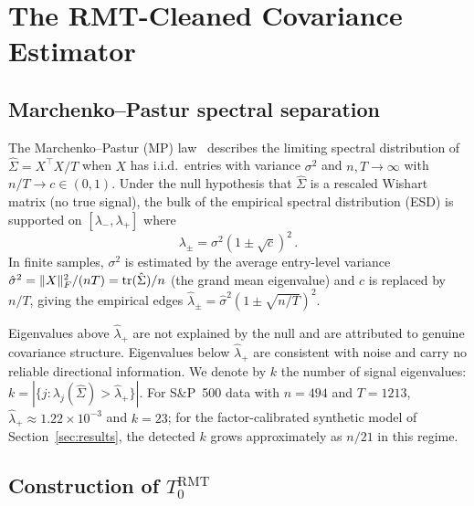 \section{The RMT-Cleaned Covariance Estimator}\label{sec:rmt}

\subsection{Marchenko--Pastur spectral separation}

The Marchenko--Pastur (MP) law~\cite{marchenko1967} describes the limiting spectral
distribution of $\hat\Sigma = X^\top X / T$ when $X$ has i.i.d.\ entries with
variance $\sigma^2$ and $n, T \to \infty$ with $n/T \to c \in (0,1)$. Under the
null hypothesis that $\hat\Sigma$ is a rescaled Wishart matrix (no true signal),
the bulk of the empirical spectral distribution (ESD) is supported on
$[\lambda_-, \lambda_+]$ where
\[
  \lambda_{\pm} = \sigma^2(1 \pm \sqrt{c})^2\,.
\]
In finite samples, $\sigma^2$ is estimated by the average entry-level variance
$\hat\sigma^2 = \lVert X \rVert_F^2/(nT) = \mathrm{tr}(\hat\Sigma)/n$ (the grand mean
eigenvalue) and $c$ is replaced by $n/T$, giving the empirical edges
$\hat\lambda_\pm = \hat\sigma^2(1 \pm \sqrt{n/T})^2$.

Eigenvalues above $\hat\lambda_+$ are not explained by the null and are attributed
to genuine covariance structure. Eigenvalues below $\hat\lambda_+$ are consistent
with noise and carry no reliable directional information. We denote by $k$ the
number of signal eigenvalues: $k = |\{j : \lambda_j(\hat\Sigma) > \hat\lambda_+\}|$.
For S\&P~500 data with $n=494$ and $T=1213$, $\hat\lambda_+ \approx 1.22 \times 10^{-3}$
and $k = 23$; for the factor-calibrated synthetic model of
Section~\ref{sec:results}, the detected $k$ grows approximately as $n/21$ in this
regime.

\subsection{Construction of \texorpdfstring{$T_0^{\mathrm{RMT}}$}{T0RMT}}


